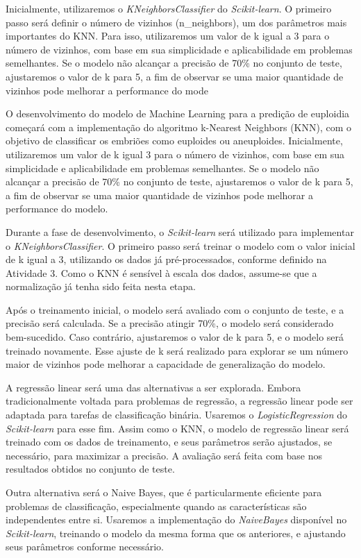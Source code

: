 Inicialmente, utilizaremos o \textit{KNeighborsClassifier} do \textit{Scikit-learn}. O primeiro passo será definir o número de vizinhos (n\_neighbors), um dos parâmetros mais importantes do KNN. Para isso,  utilizaremos um valor de 
k igual a 3 para o número de vizinhos, com base em sua simplicidade e aplicabilidade em problemas semelhantes. Se o modelo não alcançar a precisão de 70\% no conjunto de teste, ajustaremos o valor de k para 5, a fim de observar se uma maior quantidade de vizinhos pode melhorar a performance do mode

O desenvolvimento do modelo de Machine Learning para a predição de euploidia começará com a implementação do algoritmo k-Nearest Neighbors (KNN), com o objetivo de classificar os embriões como euploides ou aneuploides. Inicialmente, utilizaremos um valor de k igual 3 para o número de vizinhos, com base em sua simplicidade e aplicabilidade em problemas semelhantes. Se o modelo não alcançar a precisão de 70\% no conjunto de teste, ajustaremos o valor de k para 5, a fim de observar se uma maior quantidade de vizinhos pode melhorar a performance do modelo.

Durante a fase de desenvolvimento, o \textit{Scikit-learn} será utilizado para implementar o \textit{KNeighborsClassifier}. O primeiro passo será treinar o modelo com o valor inicial de k igual a 3, utilizando os dados já pré-processados, conforme definido na Atividade 3. Como o KNN é sensível à escala dos dados, assume-se que a normalização já tenha sido feita nesta etapa. 

Após o treinamento inicial, o modelo será avaliado com o conjunto de teste, e a precisão será calculada. Se a precisão atingir 70\%, o modelo será considerado bem-sucedido. Caso contrário, ajustaremos o valor de k para 5, e o modelo será treinado novamente. Esse ajuste de k será realizado para explorar se um número maior de vizinhos pode melhorar a capacidade de generalização do modelo.

A regressão linear será uma das alternativas a ser explorada. Embora tradicionalmente voltada para problemas de regressão, a regressão linear pode ser adaptada para tarefas de classificação binária. Usaremos o \textit{LogisticRegression} do \textit{Scikit-learn} para esse fim. Assim como o KNN, o modelo de regressão linear será treinado com os dados de treinamento, e seus parâmetros serão ajustados, se necessário, para maximizar a precisão. A avaliação será feita com base nos resultados obtidos no conjunto de teste.

Outra alternativa será o Naive Bayes, que é particularmente eficiente para problemas de classificação, especialmente quando as características são independentes entre si. Usaremos a implementação do \textit{NaiveBayes} disponível no \textit{Scikit-learn}, treinando o modelo da mesma forma que os anteriores, e ajustando seus parâmetros conforme necessário.

